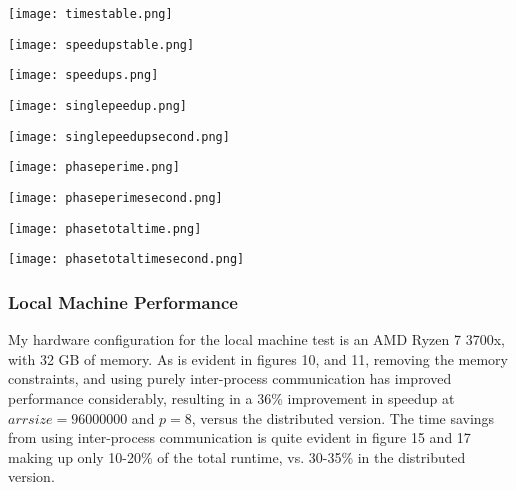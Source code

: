\documentclass[11pt]{report}
\newcommand{\SCALE}{0.5}
\begin{document}
\begin{minipage}{\SCALE\linewidth}
\texttt{[image: timestable.png]}
\end{minipage}
\hfill
\begin{minipage}{\SCALE\linewidth}
\texttt{[image: speedupstable.png]}
\end{minipage}

\begin{minipage}{\SCALE\linewidth}
\texttt{[image: speedups.png]}
\end{minipage}
\hfill
\begin{minipage}{\SCALE\linewidth}
\texttt{[image: singlepeedup.png]}
\end{minipage}

\begin{minipage}{\SCALE\linewidth}
\texttt{[image: singlepeedupsecond.png]}
\end{minipage}

\begin{minipage}{\SCALE\linewidth}
\texttt{[image: phaseperime.png]}
\end{minipage}
\hfill
\begin{minipage}{\SCALE\linewidth}
\texttt{[image: phaseperimesecond.png]}
\end{minipage}

\begin{minipage}{\SCALE\linewidth}
\texttt{[image: phasetotaltime.png]}
\end{minipage}
\hfill
\begin{minipage}{\SCALE\linewidth}
\texttt{[image: phasetotaltimesecond.png]}
\end{minipage}


\subsubsection*{Local Machine Performance}
My hardware configuration for the local machine test is an AMD Ryzen 7 3700x, with 32 GB of memory. As is evident in figures 10, and 11, removing the memory constraints, and 
using purely inter-process communication has improved performance considerably, resulting in a
36\% improvement in speedup at $arrsize=96000000$ and $p=8$, versus the distributed version. The time savings from using inter-process communication is quite evident in figure 15 and 17 making up only 10-20\% of the total runtime, vs. 30-35\% in the distributed version.
\end{document}
